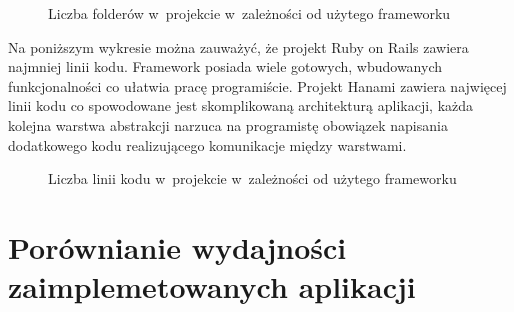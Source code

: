 \documentclass[archivemode]{mgr}
\begin{document}
\begin{figure}[H]
  \centering
  \caption{Liczba folderów w~projekcie w~zależności od użytego frameworku}
  \label{fig:folders_count}
\end{figure}

Na poniższym wykresie można zauważyć, że projekt Ruby on Rails zawiera najmniej linii kodu. Framework posiada wiele gotowych, wbudowanych funkcjonalności co ułatwia pracę programiście. Projekt Hanami zawiera najwięcej linii kodu co spowodowane jest skomplikowaną architekturą aplikacji, każda kolejna warstwa abstrakcji narzuca na programistę obowiązek napisania dodatkowego kodu realizującego komunikacje między warstwami.

\begin{figure}[H]
  \centering
  \caption{Liczba linii kodu w~projekcie w~zależności od użytego frameworku}
  \label{fig:code_lines_count}
\end{figure}


\section{Porównianie  wydajności zaimplemetowanych aplikacji}
\end{document}
